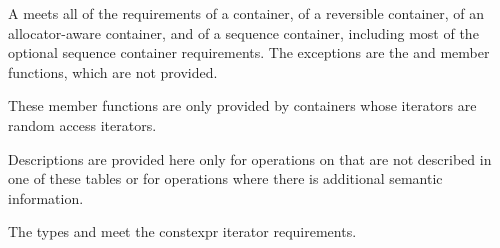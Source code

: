 \pnum
A  meets all of the requirements
of a container,
of a reversible container,
of an allocator-aware container, and
of a sequence container,
including most of the optional sequence container
requirements.
The exceptions are the
and
member functions, which are not provided.
\begin{footnote}
These member functions
are only provided by containers whose iterators
are random access iterators.
\end{footnote}
Descriptions are provided here only for operations on
that are not described in one of these tables
or for operations where there is additional semantic information.

\pnum
The types  and  meet
the constexpr iterator requirements.

